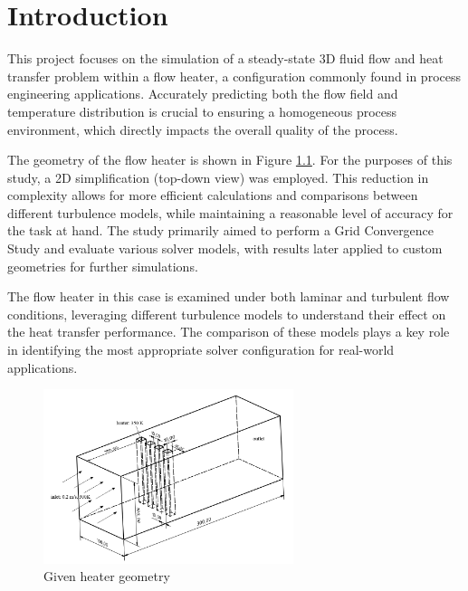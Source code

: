 \chapter{Introduction}
\label{chap:Introduction}

This project focuses on the simulation of a steady-state 3D fluid flow and heat transfer problem within a flow heater, a configuration commonly found in process engineering applications. Accurately predicting both the flow field and temperature distribution is crucial to ensuring a homogeneous process environment, which directly impacts the overall quality of the process.

The geometry of the flow heater is shown in Figure \ref{fig:heater_geo}. For the purposes of this study, a 2D simplification (top-down view) was employed. This reduction in complexity allows for more efficient calculations and comparisons between different turbulence models, while maintaining a reasonable level of accuracy for the task at hand. The study primarily aimed to perform a Grid Convergence Study and evaluate various solver models, with results later applied to custom geometries for further simulations.

The flow heater in this case is examined under both laminar and turbulent flow conditions, leveraging different turbulence models to understand their effect on the heat transfer performance. The comparison of these models plays a key role in identifying the most appropriate solver configuration for real-world applications.

    \begin{figure}[h]   
    \centering
    \includegraphics[width=0.65\textwidth]{img/heater_geo_og.png}
    \caption{Given heater geometry}
    \label{fig:heater_geo}
\end{figure}

